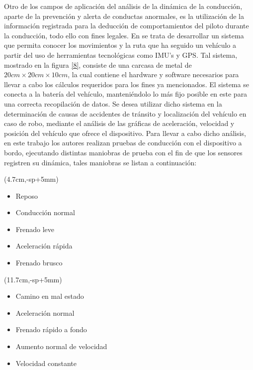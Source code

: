 Otro de los campos de aplicación del análisis de la dinámica de la conducción, aparte de la prevención y alerta de conductas anormales, es la utilización de la información registrada para la deducción de comportamientos del piloto durante la conducción, todo ello con fines legales. 
En \cite{Quito2} se trata de desarrollar un sistema que permita conocer los movimientos y la ruta que ha seguido un vehículo a partir del uso de herramientas tecnológicas como IMU’s y GPS. 
Tal sistema, mostrado en la figura \ref{8}, consiste de una carcasa de metal de $20cm\times 20cm\times 10cm$, la cual contiene el hardware y software necesarios para llevar a cabo los cálculos requeridos para los fines ya mencionados. 
El sistema se conecta a la batería del vehículo, manteniéndolo lo más fijo posible en este para una correcta recopilación de datos. 
Se desea utilizar dicho sistema en la determinación de causas de accidentes de tránsito y localización del vehículo en caso de robo, mediante el análisis de las gráficas de aceleración, velocidad y posición del vehículo que ofrece el dispositivo. 
Para llevar a cabo dicho análisis, en este trabajo los autores realizan pruebas de conducción con el dispositivo a bordo, ejecutando distintas maniobras de prueba con el fin de que los sensores registren su dinámica, tales maniobras se listan a continuación:
\vspace{8cm}

\begin{textblock*}{\textwidth}(4.7cm,\dimexpr\paperheight-sp+5mm)
\begin{itemize}
\item Reposo
\item Conducción normal 
\item Frenado leve 
\item Aceleración rápida 
\item Frenado brusco 
\end{itemize}
\end{textblock*}

\begin{textblock*}{\textwidth}(11.7cm,\dimexpr\paperheight-sp+5mm)
\begin{itemize}
\item Camino en mal estado 
\item Aceleración normal 
\item Frenado rápido a fondo
\item Aumento normal de velocidad 
\item Velocidad constante
\end{itemize}
\end{textblock*}

